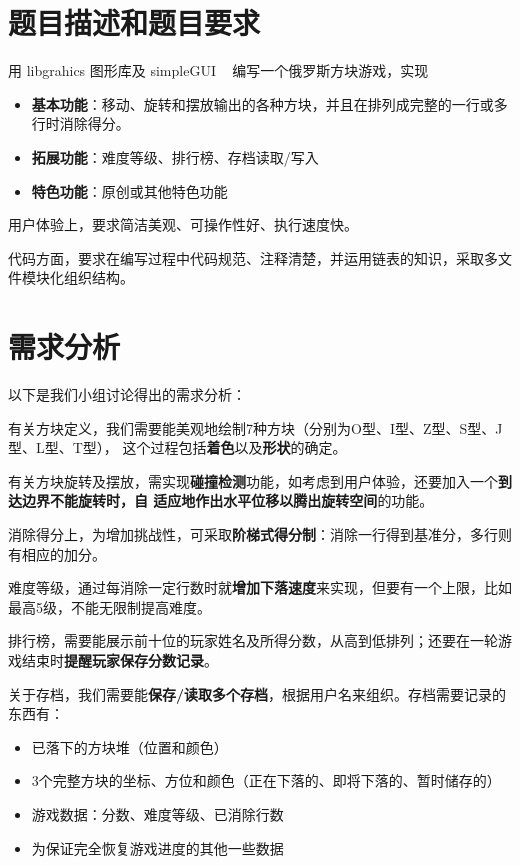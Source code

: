 \documentclass{style/ucasproposal}
\begin{document}


\tableofcontents

\clearpage
{}

\section{题目描述和题目要求}
用 libgrahics 图形库及 simpleGUI ~\cite{simplegui} 编写一个俄罗斯方块游戏，实现

\begin{itemize}
    \item \textbf{基本功能}：移动、旋转和摆放输出的各种方块，并且在排列成完整的一行或多行时消除得分。
    \item \textbf{拓展功能}：难度等级、排行榜、存档读取/写入
    \item \textbf{特色功能}：原创或其他特色功能
\end{itemize}

用户体验上，要求简洁美观、可操作性好、执行速度快。

代码方面，要求在编写过程中代码规范、注释清楚，并运用链表的知识，采取多文件模块化组织结构。


\section{需求分析}

以下是我们小组讨论得出的需求分析：

有关方块定义，我们需要能美观地绘制7种方块（分别为O型、I型、Z型、S型、J型、L型、T型），
这个过程包括\textbf{着色}以及\textbf{形状}的确定。

有关方块旋转及摆放，需实现\textbf{碰撞检测}功能，如考虑到用户体验，还要加入一个\textbf{到达边界不能旋转时，自
适应地作出水平位移以腾出旋转空间}的功能。

消除得分上，为增加挑战性，可采取\textbf{阶梯式得分制}：消除一行得到基准分，多行则有相应的加分。

难度等级，通过每消除一定行数时就\textbf{增加下落速度}来实现，但要有一个上限，比如最高5级，不能无限制提高难度。

排行榜，需要能展示前十位的玩家姓名及所得分数，从高到低排列；还要在一轮游戏结束时\textbf{提醒玩家保存分数记录}。

关于存档，我们需要能\textbf{保存/读取多个存档}，根据用户名来组织。存档需要记录的东西有：
\begin{itemize}
    \item 已落下的方块堆（位置和颜色）
    \item 3个完整方块的坐标、方位和颜色（正在下落的、即将下落的、暂时储存的）
    \item 游戏数据：分数、难度等级、已消除行数
    \item 为保证完全恢复游戏进度的其他一些数据
\end{itemize}
\end{document}
